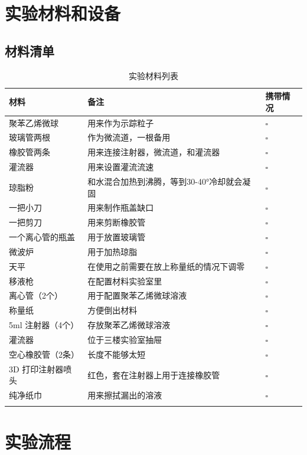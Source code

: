 \documentclass[12pt]{article}
\begin{document}
\section{实验材料和设备}
\subsection{材料清单}
{
    \footnotesize
    \begin{longtable}{@{} p{5cm} p{10cm} p{2cm} @{}}
        \toprule
        \textbf{材料} & \textbf{备注} & \textbf{携带情况} \\ 
        \midrule
        聚苯乙烯微球 & 用来作为示踪粒子 & $\square$ \\ 
        玻璃管两根 & 作为微流道，一根备用 & $\square$ \\ 
        橡胶管两条 & 用来连接注射器，微流道，和灌流器 & $\square$ \\ 
        灌流器 & 用来设置灌流流速 & $\square$ \\ 
        琼脂粉 & 和水混合加热到沸腾，等到30-40°冷却就会凝固 & $\square$ \\ 
        一把小刀 & 用来制作瓶盖缺口 & $\square$ \\ 
        一把剪刀 & 用来剪断橡胶管 & $\square$ \\ 
        一个离心管的瓶盖 & 用于放置玻璃管 & $\square$ \\ 
        微波炉 & 用于加热琼脂 & $\square$ \\ 
        天平 & 在使用之前需要在放上称量纸的情况下调零 & $\square$ \\ 
        移液枪 & 在配置材料实验室里 & $\square$\\ 
        离心管（2个） & 用于配置聚苯乙烯微球溶液 & $\square$ \\ 
        称量纸 & 方便倒出材料 & $\square$\\ 
        5ml 注射器（4个） & 存放聚苯乙烯微球溶液 & $\square$ \\ 
        灌流器 & 位于三楼实验室抽屉 & $\square$ \\ 
        空心橡胶管（2条） & 长度不能够太短 & $\square$ \\ 
        3D 打印注射器喷头 & 红色，套在注射器上用于连接橡胶管 & $\square$ \\ 
        纯净纸巾 & 用来擦拭漏出的溶液 & $\square$ \\ 
        \bottomrule
        \caption{实验材料列表}
    \end{longtable}    
}

\section{实验流程}
\end{document}
